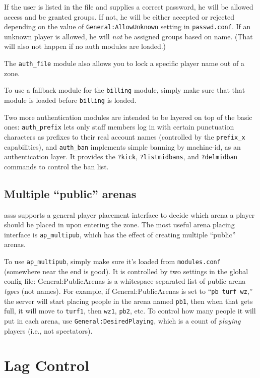 \documentclass{article}
\newcommand{\asss}{asss}
\begin{document}
If the user is listed in the file and supplies a correct password, he
will be allowed access and be granted groups. If not, he will be either
accepted or rejected depending on the value of
\verb/General:AllowUnknown/ setting in \verb/passwd.conf/. If an unknown
player is allowed, he will \emph{not} be assigned groups based on name.
(That will also not happen if no auth modules are loaded.)

The \verb/auth_file/ module also allows you to lock a specific player
name out of a zone.

To use a fallback module for the \verb/billing/ module, simply make sure
that that module is loaded before \verb/billing/ is loaded.

Two more authentication modules are intended to be layered on top of the
basic ones: \verb/auth_prefix/ lets only staff members log in with
certain punctuation characters as prefixes to their real account names
(controlled by the \verb/prefix_x/ capabilities), and \verb/auth_ban/
implements simple banning by machine-id, as an authentication layer. It
provides the \verb/?kick/, \verb/?listmidbans/, and \verb/?delmidban/
commands to control the ban list.


\subsection{Multiple ``public'' arenas}

\asss{} supports a general player placement interface to decide which
arena a player should be placed in upon entering the zone. The most
useful arena placing interface is \verb/ap_multipub/, which has the
effect of creating multiple ``public'' arenas.

To use \verb/ap_multipub/, simply make sure it's loaded from
\verb/modules.conf/ (somewhere near the end is good). It is controlled
by two settings in the global config file: General:PublicArenas is a
whitespace-separated list of public arena \emph{types} (not names). For
example, if General:PublicArenas is set to ``\verb/pb turf wz/,'' the
server will start placing people in the arena named \verb/pb1/, then
when that gets full, it will move to \verb/turf1/, then \verb/wz1/,
\verb/pb2/, etc. To control how many people it will put in each arena,
use \verb/General:DesiredPlaying/, which is a count of \emph{playing}
players (i.e., not spectators).


\section{Lag Control}
\end{document}
